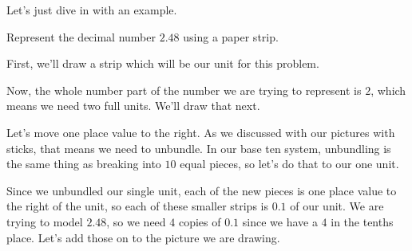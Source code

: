 \documentclass{ximera}
\begin{document}
Let's just dive in with an example.

\begin{example}
Represent the decimal number $2.48$ using a paper strip.


First, we'll draw a strip which will be our unit for this problem.

\begin{image}
\end{image}

Now, the whole number part of the number we are trying to represent is $2$, which means we need two full units. We'll draw that next.

\begin{image}
\end{image}

Let's move one place value to the right. As we discussed with our pictures with sticks, that means we need to unbundle. In our base ten system, unbundling is the same thing as breaking into $10$ equal pieces, so let's do that to our one unit.

\begin{image}
\end{image}

Since we unbundled our single unit, each of the new pieces is one place value to the right of the unit, so each of these smaller strips is $0.1$ of our unit. We are trying to model $2.48$, so we need $4$ copies of $0.1$ since we have a $4$ in the tenths place. Let's add those on to the picture we are drawing.

\begin{image}
\end{image}


\end{example}
\end{document}
